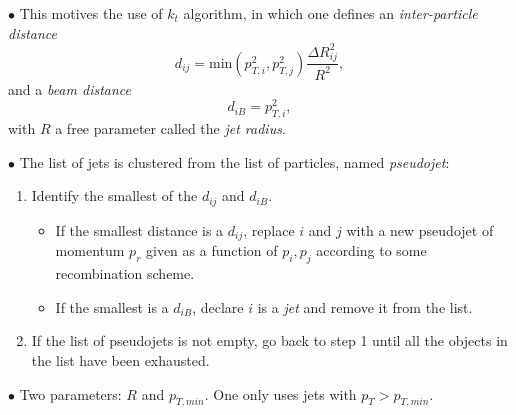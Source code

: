 \documentclass[9pt,a4paper,unknownkeysallowed,xcolor=dvipsnames,aspectratio=43]{beamer}
\begin{document}
\begin{frame}

{\color{darkred}\Large$\bullet$} This motives the use of {\color{darkred} $k_t$ algorithm}, in which one defines 
an {\em inter-particle distance}
  \begin{equation}
    d_{ij} = \text{min}(p_{T,i}^{2},p_{T,j}^{2}) \frac{\Delta R_{ij}^2}{R^2},
  \end{equation}
and
a {\em beam distance}
  \begin{equation}
    d_{iB} = p_{T,i}^{2},
  \end{equation}
  with $R$ a free parameter called the {\em jet radius}.
 \vspace{2mm}
  
{\color{darkred}\Large$\bullet$} The list of jets is clustered from the list of particles, named {\it pseudojet}:
\vspace{2mm}
\begin{enumerate}
\item Identify the smallest of the $d_{ij}$ and $d_{iB}$.
  \vspace{2mm}
  \begin{itemize}
  \item[\diamondsuit] If the smallest distance is a $d_{ij}$, replace $i$ and
    $j$ with a new pseudojet of momentum $p_r$ given as a function of $p_i, p_j$ according to some recombination scheme.
    \vspace{2mm}
    
  \item[\diamondsuit] If the smallest is a $d_{iB}$, declare $i$ is a {\em jet} and remove it from the list.
  \end{itemize}
  \item If the list of pseudojets is not empty, go back to step 1 until all the objects in the list have
  been exhausted.
\end{enumerate}
\vspace{2mm}

{\color{darkred}\Large$\bullet$} Two parameters: $R$ and $p_{T,min}$. One only uses jets with $p_T > p_{T,min}$.

\end{frame}
%
%
\end{document}
